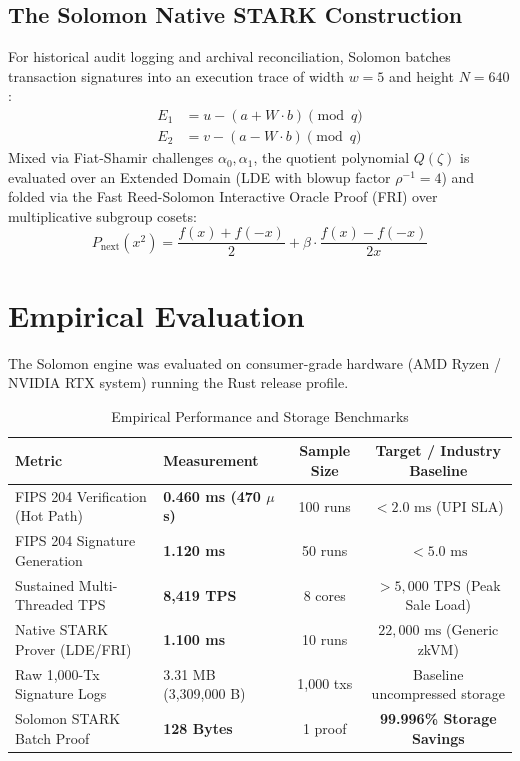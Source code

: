 \documentclass[runningheads]{llncs}
\begin{document}
\subsection{The Solomon Native STARK Construction}
For historical audit logging and archival reconciliation, Solomon batches transaction signatures into an execution trace of width $w=5$ and height $N=640$:
\begin{align}
E_1 &= u - (a + W \cdot b) \pmod q \\
E_2 &= v - (a - W \cdot b) \pmod q
\end{align}
Mixed via Fiat-Shamir challenges $\alpha_0, \alpha_1$, the quotient polynomial $Q(\zeta)$ is evaluated over an Extended Domain (LDE with blowup factor $\rho^{-1}=4$) and folded via the Fast Reed-Solomon Interactive Oracle Proof (FRI) over multiplicative subgroup cosets:
\begin{equation}
P_{\text{next}}(x^2) = \frac{f(x) + f(-x)}{2} + \beta \cdot \frac{f(x) - f(-x)}{2x}
\end{equation}

\section{Empirical Evaluation}
The Solomon engine was evaluated on consumer-grade hardware (AMD Ryzen / NVIDIA RTX system) running the Rust release profile.

\begin{table}[h]
\centering
\caption{Empirical Performance and Storage Benchmarks}
\begin{tabular}{@{}llcc@{}}
\toprule
\textbf{Metric} & \textbf{Measurement} & \textbf{Sample Size} & \textbf{Target / Industry Baseline} \\
\midrule
FIPS 204 Verification (Hot Path) & \textbf{0.460 ms (470 $\mu$s)} & 100 runs & $< 2.0\text{ ms}$ (UPI SLA) \\
FIPS 204 Signature Generation & \textbf{1.120 ms} & 50 runs & $< 5.0\text{ ms}$ \\
Sustained Multi-Threaded TPS & \textbf{8,419 TPS} & 8 cores & $> 5,000\text{ TPS}$ (Peak Sale Load) \\
Native STARK Prover (LDE/FRI) & \textbf{1.100 ms} & 10 runs & $22,000\text{ ms}$ (Generic zkVM) \\
\midrule
Raw 1,000-Tx Signature Logs & 3.31 MB (3,309,000 B) & 1,000 txs & Baseline uncompressed storage \\
Solomon STARK Batch Proof & \textbf{128 Bytes} & 1 proof & \textbf{99.996\% Storage Savings} \\
\bottomrule
\end{tabular}
\end{table}
\end{document}
